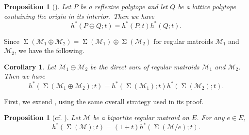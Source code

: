 \documentclass{amsart}
\numberwithin{equation}{section}
\theoremstyle{plain}
\newtheorem{cor}[thm]{Corollary}
\newtheorem{prop}[thm]{Proposition}
\theoremstyle{definition}
\newcommand{\calM}{\mathcal{M}}
\DeclareMathOperator{\SEP}{\Sigma}
\begin{document}
\begin{prop}[{\cite[Theorem 1]{Braunfreesum}}]
    Let $P$ be a reflexive polytope and let $Q$ be 
    a lattice polytope containing the origin in its interior. Then we have 
    \[
        h^*(P \oplus Q;t) =h^*(P; t) h^*(Q; t).
    \]
\end{prop}

Since $\SEP(\calM_1 \oplus \calM_2) = \SEP(\calM_1)\oplus \SEP(\calM_2)$ for regular matroids $\calM_1$ and $\calM_2$, 
we have the following.

\begin{cor}\label{free_sum}
Let $\calM_1 \oplus \calM_2$ be the direct sum of regular matroids $\calM_1$ and $\calM_2$.
Then we have 
\[h^*(\SEP(\calM_1 \oplus \calM_2);t) =h^*(\SEP(\calM_1); t) h^*(\SEP(\calM_2); t).\]
\end{cor}

First, we extend \cite[Proposition 5.4]{OhsugiTsuchiya21}, using the same overall strategy used in its proof.

\begin{prop}[{cf. \cite[Proposition 5.4]{OhsugiTsuchiya21}}]\label{prop: contraction}
    Let $\calM$ be a bipartite regular matroid on $E$.
    For any $e \in E$,
    \[
        h^*(\SEP(\calM);t) = (1+t)h^*(\SEP(\calM / e); t).
    \]
\end{prop}
\end{document}
